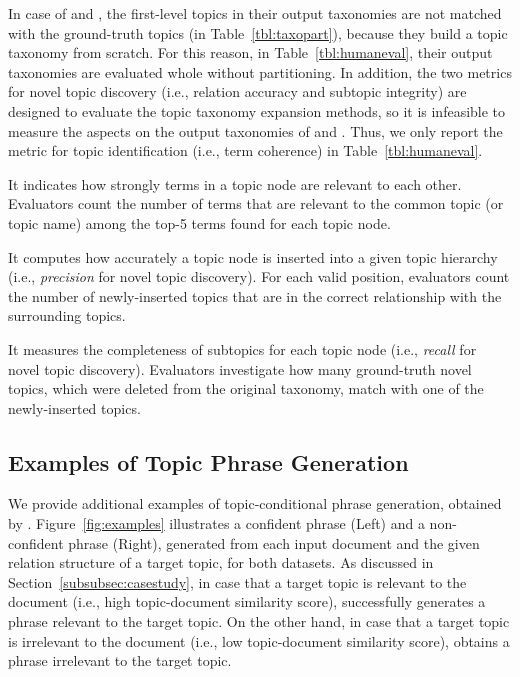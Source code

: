 In case of \hlda and \taxogen, the first-level topics in their output taxonomies are not matched with the ground-truth topics (in Table~\ref{tbl:taxopart}), because they build a topic taxonomy from scratch.
For this reason, in Table~\ref{tbl:humaneval}, their output taxonomies are evaluated whole without partitioning.
In addition, the two metrics for novel topic discovery (i.e., relation accuracy and subtopic integrity) are designed to evaluate the topic taxonomy expansion methods, so it is infeasible to measure the aspects on the output taxonomies of \hlda and \taxogen.
Thus, we only report the metric for topic identification (i.e., term coherence) in Table~\ref{tbl:humaneval}.

It indicates how strongly terms in a topic node are relevant to each other. 
Evaluators count the number of terms that are relevant to the common topic (or topic name) among the top-5 terms found for each topic node.

It computes how accurately a topic node is inserted into a given topic hierarchy (i.e., \textit{precision} for novel topic discovery).
For each valid position, evaluators count the number of newly-inserted topics that are in the correct relationship with the surrounding topics.

It measures the completeness of subtopics for each topic node (i.e., \textit{recall} for novel topic discovery).
Evaluators investigate how many ground-truth novel topics, which were deleted from the original taxonomy, match with one of the newly-inserted topics.


\subsection{Examples of Topic Phrase Generation}
\label{subsec:examples}
We provide additional examples of topic-conditional phrase generation, obtained by \proposed.
Figure~\ref{fig:examples} illustrates a confident phrase (Left) and a non-confident phrase (Right), generated from each input document and the given relation structure of a target topic, for both datasets.
As discussed in Section~\ref{subsubsec:casestudy}, 
in case that a target topic is relevant to the document (i.e., high topic-document similarity score), \proposed successfully generates a phrase relevant to the target topic.
On the other hand, in case that a target topic is irrelevant to the document (i.e., low topic-document similarity score), \proposed obtains a phrase irrelevant to the target topic.

